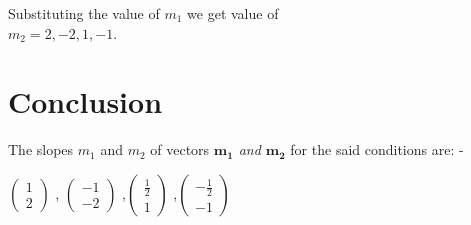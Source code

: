 \documentclass[conference]{IEEEtran}
\let\vec\mathbf
\newcommand{\myvec}[1]{\ensuremath{\begin{pmatrix}#1\end{pmatrix}}}
\begin{document}
Substituting the value of $ m_{1}$ we get value of\\
$ m_{2} = 2, -2, 1, -1$.\\

\section{Conclusion}
The slopes $ m_{1}$ and $ m_{2} $ of vectors \textit{$\vec{m_{1}}$  and    $\vec{m_{2}}$} for the said conditions are: -
\begin{center}
\myvec{1 \\ 2} , \myvec{-1 \\ -2} ,\myvec{ \frac{1}{2}\\1} ,\myvec{- \frac{1}{2}\\ -1}
\end{center}
\end{document}
